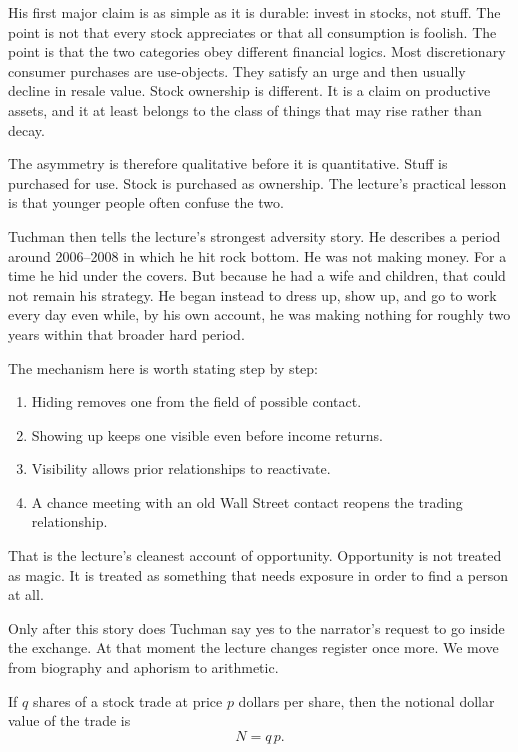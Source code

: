 His first major claim is as simple as it is durable: invest in stocks, not stuff. The point is not that every stock appreciates or that all consumption is foolish. The point is that the two categories obey different financial logics. Most discretionary consumer purchases are use-objects. They satisfy an urge and then usually decline in resale value. Stock ownership is different. It is a claim on productive assets, and it at least belongs to the class of things that may rise rather than decay.

The asymmetry is therefore qualitative before it is quantitative. Stuff is purchased for use. Stock is purchased as ownership. The lecture's practical lesson is that younger people often confuse the two.

Tuchman then tells the lecture's strongest adversity story. He describes a period around 2006--2008 in which he hit rock bottom. He was not making money. For a time he hid under the covers. But because he had a wife and children, that could not remain his strategy. He began instead to dress up, show up, and go to work every day even while, by his own account, he was making nothing for roughly two years within that broader hard period.

The mechanism here is worth stating step by step:
\begin{enumerate}
\item Hiding removes one from the field of possible contact.
\item Showing up keeps one visible even before income returns.
\item Visibility allows prior relationships to reactivate.
\item A chance meeting with an old Wall Street contact reopens the trading relationship.
\end{enumerate}
That is the lecture's cleanest account of opportunity. Opportunity is not treated as magic. It is treated as something that needs exposure in order to find a person at all.

Only after this story does Tuchman say yes to the narrator's request to go inside the exchange. At that moment the lecture changes register once more. We move from biography and aphorism to arithmetic.

\begin{definition}
If $q$ shares of a stock trade at price $p$ dollars per share, then the notional dollar value of the trade is
\begin{equation}
N = q\,p.
\end{equation}
\end{definition}


